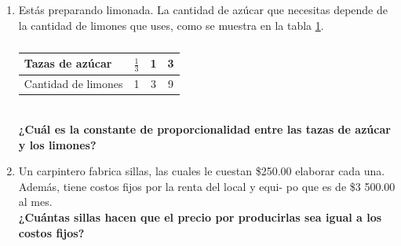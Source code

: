 \documentclass[11pt]{book}
\begin{document}
\begin{enumerate}
  \item Estás preparando limonada. La cantidad de azúcar que necesitas depende de la cantidad de limones que uses,
        como se muestra en la tabla \ref{table:azucar_limon}.
        \begin{table}[!h]
          \centering
          \begin{tabular}{|l|c|c|c|}
            \hline
            Tazas de azúcar     & $\frac{1}{3}$ & 1 & 3 \\
            \hline
            Cantidad de limones & 1             & 3 & 9 \\
            \hline
          \end{tabular}
          \caption{}
          \label{table:azucar_limon}
        \end{table}\\
        \textbf{¿Cuál es la constante de proporcionalidad entre las tazas de azúcar y los limones?}

  \item Un carpintero fabrica sillas, las cuales le cuestan \$250.00 elaborar
        cada una. Además, tiene costos fijos por la renta del local y equi-
        po que es de \$3 500.00 al mes. \\
        \textbf{¿Cuántas sillas hacen que el precio por producirlas sea igual a los costos fijos?}\\


\end{enumerate}
\end{document}
